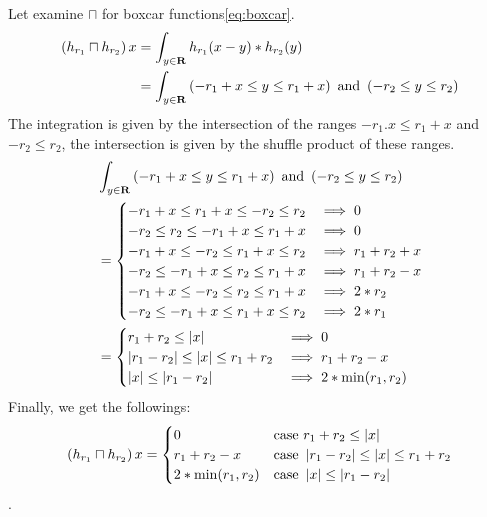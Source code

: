 Let examine $\sqcap$ for boxcar functions\eqref{eq:boxcar}.
\begin{equation}\begin{split}
	\left({h_{r_1}\sqcap h_{r_2}}\right)x 
		&= \int_{{y}\in{\mathbf{R}}}h_{r_1}(x-y)*h_{r_2}(y) \\
		&= \int_{{y}\in{\mathbf{R}}}\left({-r_1+x\le y\le r_1+x}\right)\text{ and }\left({-r_2\le y\le r_2}\right) \\
\end{split}\end{equation}
The integration is given by the intersection of the ranges
$-r_1.x\le r_1+x$ and $-r_2\le r_2$, the intersection is given by the
shuffle product of these ranges.
\begin{equation}\begin{split}
	&\int_{{y}\in{\mathbf{R}}}\left({-r_1+x\le y\le r_1+x}\right)\text{ and }\left({-r_2\le y\le r_2}\right) \\
	&=\begin{cases}
		-r_1+x\le r_1+x\le -r_2\le r_2 &\implies 0 \\
		-r_2\le r_2\le -r_1+x\le r_1+x &\implies 0 \\
		-r_1+x\le -r_2\le r_1+x\le r_2 &\implies r_1+r_2+x \\
		-r_2\le -r_1+x\le r_2\le r_1+x &\implies r_1+r_2-x \\
		-r_1+x\le -r_2\le r_2\le r_1+x &\implies 2*r_2 \\
		-r_2\le -r_1+x\le r_1+x\le r_2 &\implies 2*r_1 \\
		\end{cases} \\
	&=\begin{cases}
		r_1+r_2 \le  \left|{x}\right| &\implies 0 \\
		\left|{r_1-r_2}\right| \le \left|{x}\right| \le r_1+r_2 &\implies r_1+r_2-x \\
		\left|{x}\right| \le  \left|{r_1-r_2}\right| &\implies 2*\min(r_1,r_2) \\
		\end{cases} \\
\end{split}\end{equation}
Finally, we get the followings:
\begin{equation}\begin{split}
	\left({h_{r_1}\sqcap h_{r_2}}\right)x 
		&=\begin{cases}
			0 & \text{case } r_1+r_2 \le \left|{x}\right| \\
			r_1+r_2-x & \text{case } \left|{r_1-r_2}\right| \le \left|{x}\right| \le r_1+r_2 \\
			2*\min(r_1,r_2) & \text{case } \left|{x}\right| \le  \left|{r_1-r_2}\right| \\
			\end{cases} \\
\end{split}\end{equation}
. 

